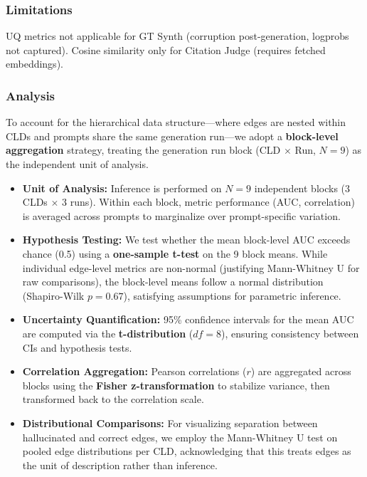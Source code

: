 \subsubsection{Limitations}
UQ metrics not applicable for GT Synth (corruption post-generation, logprobs not captured). Cosine similarity only for Citation Judge (requires fetched embeddings).

\subsubsection{Analysis}
\label{sec:rq2_analysis}

To account for the hierarchical data structure---where edges are nested within CLDs and prompts share the same generation run---we adopt a \textbf{block-level aggregation} strategy, treating the generation run block (CLD $\times$ Run, $N=9$) as the independent unit of analysis.

\begin{itemize}[noitemsep]
    \item \textbf{Unit of Analysis:} Inference is performed on $N=9$ independent blocks (3 CLDs $\times$ 3 runs). Within each block, metric performance (AUC, correlation) is averaged across prompts to marginalize over prompt-specific variation.
    \item \textbf{Hypothesis Testing:} We test whether the mean block-level AUC exceeds chance (0.5) using a \textbf{one-sample t-test} on the 9 block means. While individual edge-level metrics are non-normal (justifying Mann-Whitney U for raw comparisons), the block-level means follow a normal distribution (Shapiro-Wilk $p=0.67$), satisfying assumptions for parametric inference.
    \item \textbf{Uncertainty Quantification:} 95\% confidence intervals for the mean AUC are computed via the \textbf{t-distribution} ($df=8$), ensuring consistency between CIs and hypothesis tests.
    \item \textbf{Correlation Aggregation:} Pearson correlations ($r$) are aggregated across blocks using the \textbf{Fisher z-transformation} to stabilize variance, then transformed back to the correlation scale.
    \item \textbf{Distributional Comparisons:} For visualizing separation between hallucinated and correct edges, we employ the Mann-Whitney U test on pooled edge distributions per CLD, acknowledging that this treats edges as the unit of description rather than inference.
\end{itemize}

